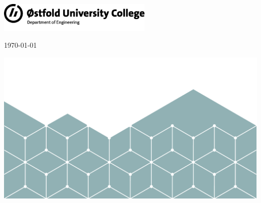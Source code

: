 
\begin{titlepage}

    \begin{flushright}
        \includegraphics*[width=74mm]{images/logo.png}
    \end{flushright}

    \vspace{2cm}



    {\LARGE \textbf{\thesisTitle}}

    \vspace{0.5cm}

    {\large \thesisSubtitle}

    \vspace{1cm}

    {\large \authorName}


    \vspace{1cm}

    {\large \programName}

    \vspace{0.5cm}

    {\large \departmentName}

    \vspace{1cm}

    {\large \supervisorName}

    \vspace{2cm}

    {\large \today}

    \centering
    \vspace*{\fill}
    \includegraphics*[width=\textwidth]{images/cover.png}

    \thispagestyle{empty} %
\end{titlepage}
